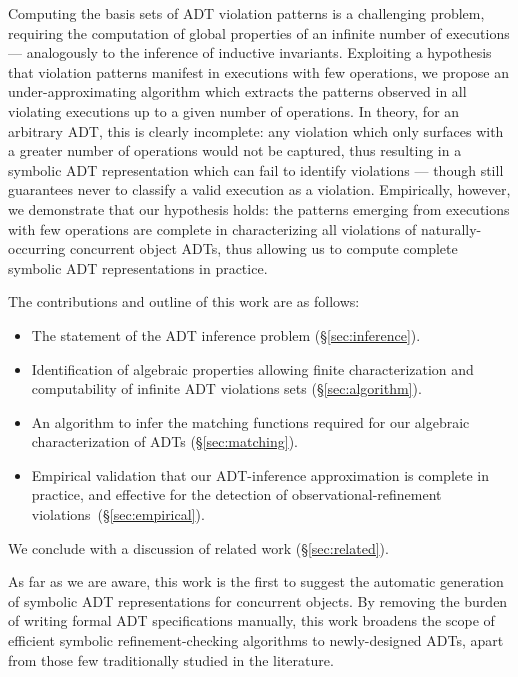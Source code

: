 Computing the basis sets of ADT violation patterns is a challenging problem,
requiring the computation of global properties of an infinite number of
executions — analogously to the inference of inductive invariants. Exploiting a
hypothesis that violation patterns manifest in executions with few operations,
we propose an under-approximating algorithm which extracts the patterns
observed in all violating executions up to a given number of operations. In
theory, for an arbitrary ADT, this is clearly incomplete: any violation which
only surfaces with a greater number of operations would not be captured, thus
resulting in a symbolic ADT representation which can fail to identify
violations — though still guarantees never to classify a valid execution as a
violation. Empirically, however, we demonstrate that our hypothesis holds: the
patterns emerging from executions with few operations are complete in
characterizing all violations of naturally-occurring concurrent object ADTs,
thus allowing us to compute complete symbolic ADT representations in practice.

The contributions and outline of this work are as follows:
\begin{itemize}

  \item The statement of the ADT inference problem (§\ref{sec:inference}).

  \item Identification of algebraic properties allowing finite characterization
  and computability of infinite ADT violations sets (§\ref{sec:algorithm}).

  \item An algorithm to infer the matching functions required for our algebraic
  characterization of ADTs (§\ref{sec:matching}).

  \item Empirical validation that our ADT-inference approximation is complete
  in practice, and effective for the detection of observational-refinement
  violations~(§\ref{sec:empirical}).

\end{itemize}
We conclude with a discussion of related work (§\ref{sec:related}).

As far as we are aware, this work is the first to suggest the automatic
generation of symbolic ADT representations for concurrent objects. By removing
the burden of writing formal ADT specifications manually, this work broadens
the scope of efficient symbolic refinement-checking algorithms to
newly-designed ADTs, apart from those few traditionally studied in the
literature.
